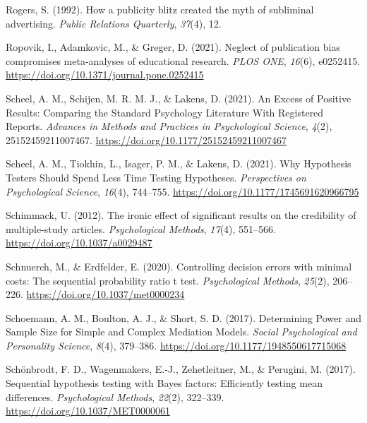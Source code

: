 \documentclass[
  letterpaper,
  DIV=11,
  numbers=noendperiod]{scrreprt}
\newlength{\cslhangindent}
\newlength{\cslentryspacingunit} %
\newenvironment{CSLReferences}[2] %
 {%
  \setlength{\parindent}{0pt}
  \ifodd #1
  \let\oldpar\par
  \def\par{\hangindent=\cslhangindent\oldpar}
  \fi
  \setlength{\parskip}{#2\cslentryspacingunit}
 }%
 {}
\begin{document}
\begin{CSLReferences}{1}{0}
\leavevmode{}%
Rogers, S. (1992). How a publicity blitz created the myth of subliminal
advertising. \emph{Public Relations Quarterly}, \emph{37}(4), 12.

\leavevmode{}%
Ropovik, I., Adamkovic, M., \& Greger, D. (2021). Neglect of publication
bias compromises meta-analyses of educational research. \emph{PLOS ONE},
\emph{16}(6), e0252415.
\url{https://doi.org/10.1371/journal.pone.0252415}

\leavevmode{}%
Scheel, A. M., Schijen, M. R. M. J., \& Lakens, D. (2021). An {Excess}
of {Positive Results}: {Comparing} the {Standard Psychology Literature
With Registered Reports}. \emph{Advances in Methods and Practices in
Psychological Science}, \emph{4}(2), 25152459211007467.
\url{https://doi.org/10.1177/25152459211007467}

\leavevmode{}%
Scheel, A. M., Tiokhin, L., Isager, P. M., \& Lakens, D. (2021). Why
{Hypothesis Testers Should Spend Less Time Testing Hypotheses}.
\emph{Perspectives on Psychological Science}, \emph{16}(4), 744--755.
\url{https://doi.org/10.1177/1745691620966795}

\leavevmode{}%
Schimmack, U. (2012). The ironic effect of significant results on the
credibility of multiple-study articles. \emph{Psychological Methods},
\emph{17}(4), 551--566. \url{https://doi.org/10.1037/a0029487}

\leavevmode{}%
Schnuerch, M., \& Erdfelder, E. (2020). Controlling decision errors with
minimal costs: {The} sequential probability ratio t test.
\emph{Psychological Methods}, \emph{25}(2), 206--226.
\url{https://doi.org/10.1037/met0000234}

\leavevmode{}%
Schoemann, A. M., Boulton, A. J., \& Short, S. D. (2017). Determining
{Power} and {Sample Size} for {Simple} and {Complex Mediation Models}.
\emph{Social Psychological and Personality Science}, \emph{8}(4),
379--386. \url{https://doi.org/10.1177/1948550617715068}

\leavevmode{}%
Schönbrodt, F. D., Wagenmakers, E.-J., Zehetleitner, M., \& Perugini, M.
(2017). Sequential hypothesis testing with {Bayes} factors:
{Efficiently} testing mean differences. \emph{Psychological Methods},
\emph{22}(2), 322--339. \url{https://doi.org/10.1037/MET0000061}


\end{CSLReferences}
\end{document}
